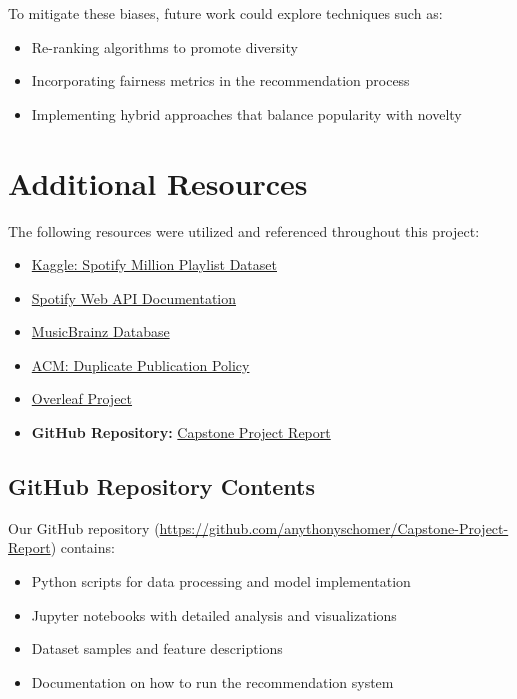 \documentclass[runningheads]{llncs}
\begin{document}
To mitigate these biases, future work could explore techniques such as:
\begin{itemize}
    \item Re-ranking algorithms to promote diversity
    \item Incorporating fairness metrics in the recommendation process
    \item Implementing hybrid approaches that balance popularity with novelty
\end{itemize}

\section{Additional Resources}
The following resources were utilized and referenced throughout this project:

\begin{itemize}
    \item \href{https://www.kaggle.com/datasets/shubhendra/million-playlist-dataset}{Kaggle: Spotify Million Playlist Dataset}
    \item \href{https://developer.spotify.com/documentation/web-api/}{Spotify Web API Documentation}
    \item \href{https://musicbrainz.org/}{MusicBrainz Database}
    \item \href{https://www.acm.org/publications/policies/duplicate-publication}{ACM: Duplicate Publication Policy}
    \item \href{https://www.overleaf.com/project}{Overleaf Project}
    \item \textbf{GitHub Repository:} \href{https://github.com/anythonyschomer/Capstone-Project-Report}{Capstone Project Report}
\end{itemize}

\subsection{GitHub Repository Contents}
Our GitHub repository (\url{https://github.com/anythonyschomer/Capstone-Project-Report}) contains:
\begin{itemize}
    \item Python scripts for data processing and model implementation
    \item Jupyter notebooks with detailed analysis and visualizations
    \item Dataset samples and feature descriptions
    \item Documentation on how to run the recommendation system
\end{itemize}
\end{document}
